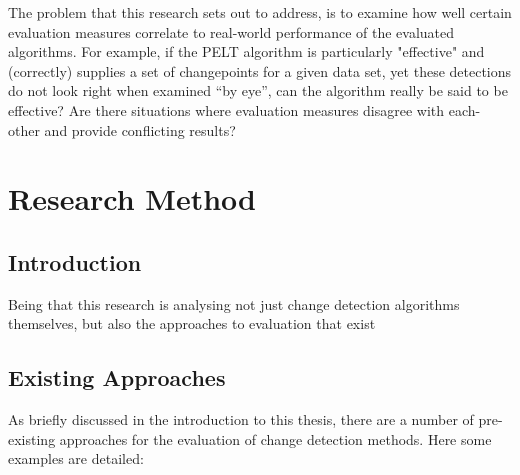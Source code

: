 \documentclass{uvamscse}	%
\begin{document}
The problem that this research sets out to address, is to examine how well certain evaluation measures correlate to real-world performance of the evaluated algorithms. For example, if the PELT algorithm is particularly "effective" and (correctly) supplies a set of changepoints for a given data set, yet these detections do not look right when examined ``by eye'', can the algorithm really be said to be effective? Are there situations where evaluation measures disagree with each-other and provide conflicting results?

\chapter{Research Method}

\section{Introduction}

Being that this research is analysing not just change detection algorithms themselves, but also the approaches to evaluation that exist

\section{Existing Approaches}

As briefly discussed in the introduction to this thesis, there are a number of pre-existing approaches for the evaluation of change detection methods. Here some examples are detailed:
\end{document}
